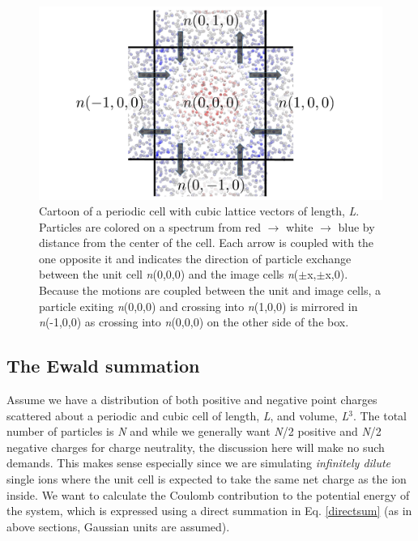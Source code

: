 \begin{theory}
  \newpage
  \begin{figure}
      \centering
      \includegraphics[width=0.98\linewidth]{images/pbc_example.pdf}
      \caption[Cartoon of a cubic periodic system]{Cartoon of a periodic cell with cubic lattice vectors of 
      length, \emph{L}. Particles are colored on a spectrum from red $\rightarrow$ white $\rightarrow$ blue
      by distance from the center of the cell. Each arrow is coupled with the one opposite it and indicates
      the direction of particle exchange between the unit cell \emph{n}(0,0,0) and the image cells 
      \emph{n}($\pm$x,$\pm$x,0). Because the motions are coupled between the unit and image cells, a particle
      exiting \emph{n}(0,0,0) and crossing into \emph{n}(1,0,0) is mirrored in \emph{n}(-1,0,0) as crossing 
      into \emph{n}(0,0,0) on the other side of the box.}
      \label{fig:pbc}
  \end{figure}
  
  \subsection{\label{ch2:sec3:level4}The Ewald summation}
  Assume we have a distribution of both positive and negative point charges scattered about a periodic and cubic
  cell of length, \emph{L}, and volume, \emph{L}$^{3}$. The total number of particles is \emph{N} and while we
  generally want \emph{N}/2 positive and \emph{N}/2 negative charges for charge neutrality, the discussion here
  will make no such demands. This makes sense especially since we are simulating \emph{infinitely dilute} single 
  ions where the unit cell is expected to take the same net charge as the ion inside. We want to calculate the
  Coulomb contribution to the potential energy of the system, which is expressed using a direct summation in Eq.
  \ref{directsum} (as in above sections, Gaussian units are assumed).
  

\end{theory}
